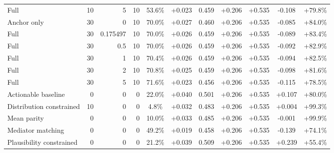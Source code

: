\begin{table}[htbp]
\begin{tabular}{lrrrccccccc}
Full & 10 & 5 & 10 & 53.6\% & +0.023 & 0.459 & +0.206 & +0.535 & -0.108 & +79.8\% \\
Anchor only & 30 & 0 & 10 & 70.0\% & +0.027 & 0.460 & +0.206 & +0.535 & -0.085 & +84.0\% \\
Full & 30 & 0.175497 & 10 & 70.0\% & +0.026 & 0.459 & +0.206 & +0.535 & -0.089 & +83.4\% \\
Full & 30 & 0.5 & 10 & 70.0\% & +0.026 & 0.459 & +0.206 & +0.535 & -0.092 & +82.9\% \\
Full & 30 & 1 & 10 & 70.4\% & +0.026 & 0.459 & +0.206 & +0.535 & -0.094 & +82.5\% \\
Full & 30 & 2 & 10 & 70.8\% & +0.025 & 0.459 & +0.206 & +0.535 & -0.098 & +81.6\% \\
Full & 30 & 5 & 10 & 71.6\% & +0.023 & 0.456 & +0.206 & +0.535 & -0.115 & +78.5\% \\
Actionable baseline & 0 & 0 & 0 & 22.0\% & +0.040 & 0.501 & +0.206 & +0.535 & +0.107 & +80.0\% \\
Distribution constrained & 10 & 0 & 0 & 4.8\% & +0.032 & 0.483 & +0.206 & +0.535 & +0.004 & +99.3\% \\
Mean parity & 0 & 0 & 0 & 10.0\% & +0.033 & 0.485 & +0.206 & +0.535 & -0.001 & +99.9\% \\
Mediator matching & 0 & 0 & 0 & 49.2\% & +0.019 & 0.458 & +0.206 & +0.535 & -0.139 & +74.1\% \\
Plausibility constrained & 0 & 0 & 0 & 21.2\% & +0.039 & 0.509 & +0.206 & +0.535 & +0.239 & +55.4\% \\
\bottomrule
\end{tabular}
\end{table}